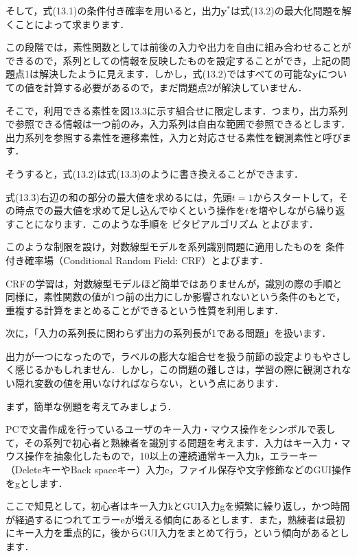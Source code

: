 そして，式(13.1)の条件付き確率を用いると，出力$\bm{y}^*$は式(13.2)の最大化問題を解くことによって求まります．

この段階では，素性関数としては前後の入力や出力を自由に組み合わせることができるので，系列としての情報を反映したものを設定することができ，上記の問題点1は解決したように見えます．しかし，式(13.2)ではすべての可能な$\bm{y}$についての値を計算する必要があるので，まだ問題点2が解決していません．


そこで，利用できる素性を図13.3に示す組合せに限定します．つまり，出力系列で参照できる情報は一つ前のみ，入力系列は自由な範囲で参照できるとします．出力系列を参照する素性を遷移素性，入力と対応させる素性を観測素性と呼びます．


そうすると，式(13.2)は式(13.3)のように書き換えることができます．

式(13.3)右辺の和の部分の最大値を求めるには，先頭$t=1$からスタートして，その時点での最大値を求めて足し込んでゆくという操作を$t$を増やしながら繰り返すことになります．このような手順を
ビタビアルゴリズム
とよびます．

このような制限を設け，対数線型モデルを系列識別問題に適用したものを
条件付き確率場（Conditional Random Field: CRF）とよびます．

CRFの学習は，対数線型モデルほど簡単ではありませんが，識別の際の手順と同様に，素性関数の値が1つ前の出力にしか影響されないという条件のもとで，重複する計算をまとめることができるという性質を利用します．


次に，「入力の系列長に関わらず出力の系列長が1である問題」を扱います．

出力が一つになったので，ラベルの膨大な組合せを扱う前節の設定よりもやさしく感じるかもしれません．しかし，この問題の難しさは，学習の際に観測されない隠れ変数の値を用いなければならない，という点にあります．

まず，簡単な例題を考えてみましょう．

PCで文書作成を行っているユーザのキー入力・マウス操作をシンボルで表して，その系列で初心者と熟練者を識別する問題を考えます．入力はキー入力・マウス操作を抽象化したもので，10以上の連続通常キー入力k，エラーキー（DeleteキーやBack spaceキー）入力e，ファイル保存や文字修飾などのGUI操作をgとします．

ここで知見として，初心者はキー入力kとGUI入力gを頻繁に繰り返し，かつ時間が経過するにつれてエラーeが増える傾向にあるとします．また，熟練者は最初にキー入力を重点的に，後からGUI入力をまとめて行う，という傾向があるとします．

